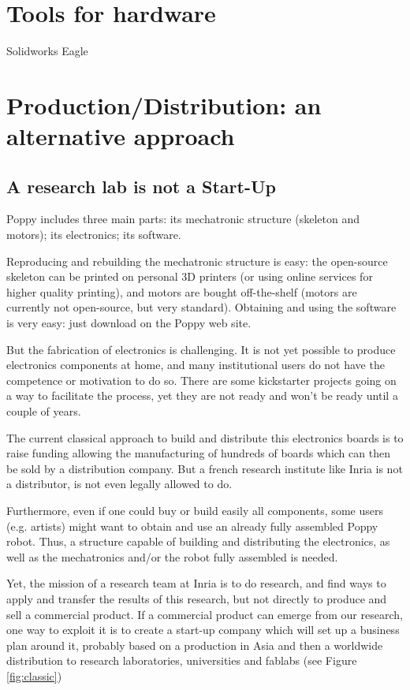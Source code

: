 \section{Tools for hardware} %
\label{sec:tools_for_hardware}

Solidworks Eagle


\section{Production/Distribution: an alternative approach} %

\subsection{A research lab is not a Start-Up} %
Poppy includes three main parts: its mechatronic structure (skeleton and motors); its electronics; its software.

Reproducing and rebuilding the mechatronic structure is easy: the open-source skeleton can be printed on personal 3D printers (or using online services for higher quality printing), and motors are bought off-the-shelf (motors are currently not open-source, but very standard). Obtaining and using the software is very easy: just download on the Poppy web site.

But the fabrication of electronics is challenging. It is not yet possible to produce electronics components at home, and many institutional users do not have the competence or motivation to do so. There are some kickstarter projects going on a way to facilitate the process, yet they are not ready and won't be ready until a couple of years.

The current classical approach to build and distribute this electronics boards is to raise funding allowing the manufacturing of hundreds of boards which can then be sold by a distribution company. But a french research institute like Inria is not a distributor,  is not even legally allowed to do.

Furthermore, even if one could buy or build easily all components, some users (e.g. artists) might want to obtain and use an already fully assembled Poppy robot. Thus, a structure capable of building and distributing the electronics, as well as the mechatronics and/or the robot fully assembled is needed.

Yet, the mission of a research team at Inria is to do research, and find ways to apply and transfer the results of this research, but not directly to produce and sell a commercial product. If a commercial product can emerge from our research, one way to exploit it is to create a start-up company which will set up a business plan around it, probably based on a production in Asia and then a worldwide distribution to research laboratories, universities and fablabs (see Figure \ref{fig:classic})

